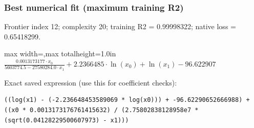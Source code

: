 \documentclass[10pt,letterpaper,landscape]{article}
\begin{document}
\begin{minipage}[t]{0.485\textwidth}
\subsubsection*{Best numerical fit (maximum training R2)}
Frontier index 12; complexity 20; training R2 = 0.99998322; native loss = 0.65418299.
\begin{center}\begin{adjustbox}{max width=\linewidth,max totalheight=1.0in}$\displaystyle \frac{0.0013173177 \cdot x_{0}}{5603774.5 - 27580284.0 \cdot x_{1}} + 2.2366485 \cdot \ln{\left(x_{0} \right)} + \ln{\left(x_{1} \right)} - 96.622907$\end{adjustbox}\end{center}
{\scriptsize Exact saved expression (use this for coefficient checks):}
\begin{lstlisting}
((log(x1) - (-2.236648453589069 * log(x0))) + -96.62290652666988) + ((x0 * 0.0013173176761415632) / (2.75802838128958e7 * (sqrt(0.04128229500607973) - x1)))
\end{lstlisting}
\end{minipage}\hfill
\end{document}
